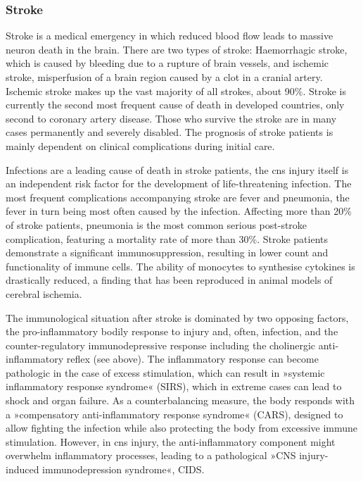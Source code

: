 \subsubsection{Stroke} 
Stroke is a medical emergency in which reduced blood flow leads to massive neuron death in the brain. There are two types of stroke: Haemorrhagic stroke, which is caused by bleeding due to a rupture of brain vessels, and ischemic stroke, misperfusion of a brain region caused by a clot in a cranial artery. Ischemic stroke makes up the vast majority of all strokes, about 90\%. Stroke is currently the second most frequent cause of death in developed countries, only second to coronary artery disease. Those who survive the stroke are in many cases permanently and severely disabled. The prognosis of stroke patients is mainly dependent on clinical complications during initial care.

Infections are a leading cause of death in stroke patients, the \ac{cns} injury itself is an independent risk factor for the development of life-threatening infection. The most frequent complications accompanying stroke are fever and pneumonia, the fever in turn being most often caused by the infection. Affecting more than 20\% of stroke patients, pneumonia is the most common serious post-stroke complication, featuring a mortality rate of more than 30\%\cite{Meisel2005}. Stroke patients demonstrate a significant immunosuppression, resulting in lower count and functionality of immune cells. The ability of monocytes to synthesise cytokines is drastically reduced, a finding that has been reproduced in animal models of cerebral ischemia.

The immunological situation after stroke is dominated by two opposing factors, the pro-inflammatory bodily response to injury and, often, infection, and the counter-regulatory immunodepressive response including the cholinergic anti-inflammatory reflex (see above). The inflammatory response can become pathologic in the case of excess stimulation, which can result in »systemic inflammatory response syndrome« (SIRS), which in extreme cases can lead to shock and organ failure. As a counterbalancing measure, the body responds with a »compensatory anti-inflammatory response syndrome« (CARS), designed to allow fighting the infection while also protecting the body from excessive immune stimulation. However, in \ac{cns} injury, the anti-inflammatory component might overwhelm inflammatory processes, leading to a pathological »CNS injury-induced immunodepression syndrome«, CIDS.

